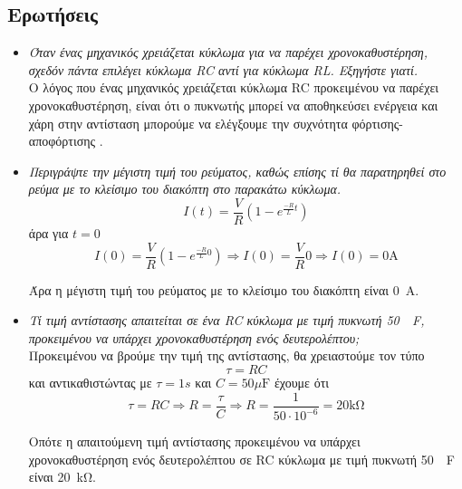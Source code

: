 \documentclass{article}
\begin{document}
\subsection{Ερωτήσεις}
\begin{itemize}
	\item \textit{Όταν ένας μηχανικός χρειάζεται κύκλωμα για να παρέχει χρονοκαθυστέρηση,
			σχεδόν πάντα επιλέγει κύκλωμα RC αντί για κύκλωμα RL. Εξηγήστε γιατί.} \\

	Ο λόγος που ένας μηχανικός χρειάζεται κύκλωμα RC προκειμένου να παρέχει χρονοκαθυστέρηση,
	είναι ότι ο πυκνωτής μπορεί να αποθηκεύσει ενέργεια και χάρη στην αντίσταση μπορούμε να ελέγξουμε
	την συχνότητα φόρτισης-αποφόρτισης \cite{papadopoulos}. \\

	\item \textit{Περιγράψτε την μέγιστη τιμή του ρεύματος, καθώς επίσης τί θα παρατηρηθεί
			στο ρεύμα με το κλείσιμο του διακόπτη στο παρακάτω κύκλωμα.} \\
	
	\[I(t) = \frac{V}{R}(1 - e^{\frac{-R}{L}t})\]
	άρα για $t = 0$
	\[I(0) = \frac{V}{R}(1 - e^{\frac{-R}{L}0}) \Rightarrow I(0) = \frac{V}{R}0
		\Rightarrow I(0) = \si{0\ampere}\]

	Άρα η μέγιστη τιμή του ρεύματος με το κλείσιμο του διακόπτη είναι \si{0\ampere}.
	
	\item \textit{Τί τιμή αντίστασης απαιτείται σε ένα RC κύκλωμα με τιμή πυκνωτή \si{50\mu\farad},
			προκειμένου να υπάρχει χρονοκαθυστέρηση ενός δευτερολέπτου;} \\

        Προκειμένου να βρούμε την τιμή της αντίστασης, θα χρειαστούμε τον τύπο
        \[τ = RC\]
        και αντικαθιστώντας με $τ = 1s$ και $C = \si{50\mu\farad}$ έχουμε ότι
        \[τ = RC \Rightarrow R = \frac{τ}{C} \Rightarrow R =
            \frac{1}{50 \cdot 10^{-6}} = \si{20\kohm}\]

        Οπότε η απαιτούμενη τιμή αντίστασης προκειμένου να υπάρχει χρονοκαθυστέρηση
        ενός δευτερολέπτου σε RC κύκλωμα με τιμή πυκνωτή \si{50\mu\farad} είναι
        \si{20\kohm}.
\end{itemize}

\renewcommand\refname{Πηγές}
\printbibliography
\end{document}
